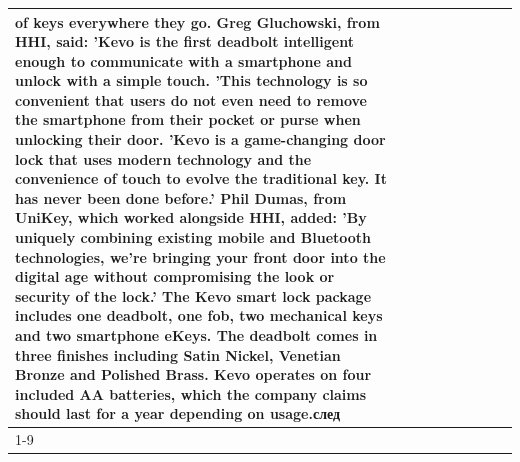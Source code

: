 \begin{table}[H]
\begin{tabular}{lllrlllll}
of keys everywhere they go. Greg Gluchowski, from HHI, said: 'Kevo is the first deadbolt intelligent enough to communicate with a smartphone and unlock with a simple touch. 'This technology is so convenient that users do not even need to remove the smartphone from their pocket or purse when unlocking their door. 'Kevo is a game-changing door lock that uses modern technology and the convenience of touch to evolve the traditional key. It has never been done before.' Phil Dumas, from UniKey, which worked alongside HHI, added: 'By uniquely combining existing mobile and Bluetooth technologies, we’re bringing your front door into the digital age without compromising the look or security of the lock.' The Kevo smart lock package includes one deadbolt, one fob, two mechanical keys and two smartphone eKeys. The deadbolt comes in three finishes including Satin Nickel, Venetian Bronze and Polished Brass. Kevo operates on four included AA batteries, which the company claims should last for a year depending on usage.след \\
\cline{1-9}

\end{tabular}
\end{table}
